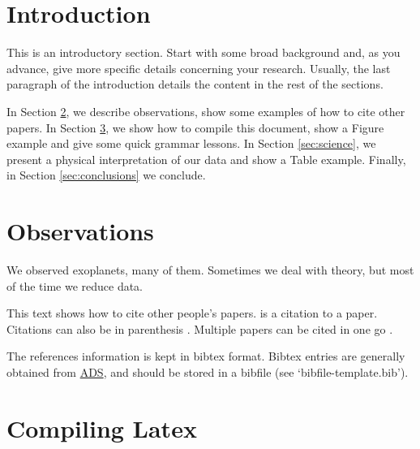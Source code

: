

\section{Introduction}
\label{introduction}

This is an introductory section.  Start with some broad background and,
as you advance, give more specific details concerning your research.
Usually, the last paragraph of the introduction details the content in
the rest of the sections.

In Section \ref{sec:observations}, we describe observations, show some
examples of how to cite other papers.  In Section
\ref{sec:compile}, we show how to compile this document, show a Figure
example and give some quick grammar lessons.  In Section
\ref{sec:science}, we present a physical interpretation of our data
and show a Table example.  Finally, in Section \ref{sec:conclusions}
we conclude.

\section{Observations}
\label{sec:observations}

We observed exoplanets, many of them.  Sometimes we deal with theory,
but most of the time we reduce data.

This text shows how to cite other people's papers.
\citet{HarringtonEtal2006sciuandbphas} is a citation to a paper.
Citations can also be in parenthesis
\citep[e.g.,][]{HarringtonEtal2007natHD149026b}.  Multiple papers can
be cited in one go \citep{StevensonEtal2010natGJ436b,
  StevensonEtal2012apjHD149026b, StevensonEtal2012apjGJ436c,
  BlecicEtal2013apjWASP14b, BlecicEtal2014apjWASP43b,
  CubillosEtal2013apjWASP8b, CubillosEtal2014apjTrES1,
  CampoEtal2011apjWASP12b, NymeyerEtal2011apjWASP18b}.

The references information is kept in bibtex format.  Bibtex entries
are generally obtained from
\href{http://adsabs.harvard.edu/abstract_service.html}{ADS}, and
should be stored in a bibfile (see `bibfile-template.bib').


\section{Compiling Latex}
\label{sec:compile}

